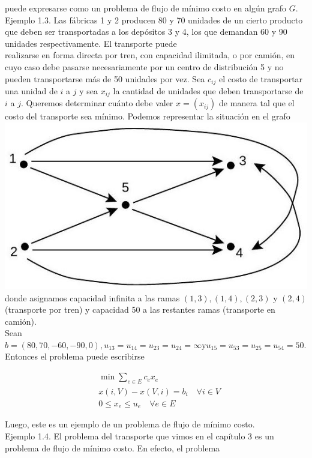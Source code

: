 \documentclass[10pt]{article}
\begin{document}
puede expresarse como un problema de flujo de mínimo costo en algún grafo $G$.\\
Ejemplo 1.3. Las fábricas 1 y 2 producen 80 y 70 unidades de un cierto producto que deben ser transportadas a los depósitos 3 y 4, los que demandan 60 y 90 unidades respectivamente. El transporte puede\\
realizarse en forma directa por tren, con capacidad ilimitada, o por camión, en cuyo caso debe pasarse necesariamente por un centro de distribución 5 y no pueden transportarse más de 50 unidades por vez. Sea $c_{i j}$ el costo de transportar una unidad de $i$ a $j$ y sea $x_{i j}$ la cantidad de unidades que deben transportarse de $i$ a $j$. Queremos determinar cuánto debe valer $x=\left(x_{i j}\right)$ de manera tal que el costo del transporte sea mínimo. Podemos representar la situación en el grafo\\
\includegraphics[max width=\textwidth, center]{2025_09_05_955b52bfc43174a24a9ag-04}\\
donde asignamos capacidad infinita a las ramas $(1,3),(1,4),(2,3)$ y $(2,4)$ (transporte por tren) y capacidad 50 a las restantes ramas (transporte en camión).\\
Sean $b=(80,70,-60,-90,0), u_{13}=u_{14}=u_{23}=u_{24}=\infty \mathrm{y} u_{15}=u_{53}=u_{25}=u_{54}=50$. Entonces el problema puede escribirse

$$
\begin{aligned}
& \min \sum_{e \in E} c_{e} x_{e} \\
& x(i, V)-x(V, i)=b_{i} \quad \forall i \in V \\
& 0 \leq x_{e} \leq u_{e} \quad \forall e \in E
\end{aligned}
$$

Luego, este es un ejemplo de un problema de flujo de mínimo costo.\\
Ejemplo 1.4. El problema del transporte que vimos en el capítulo 3 es un problema de flujo de mínimo costo. En efecto, el problema
\end{document}
